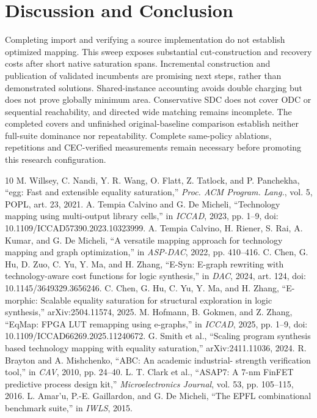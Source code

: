 \documentclass[conference]{IEEEtran}
\begin{document}
\section{Discussion and Conclusion}
Completing import and verifying a source implementation do not establish optimized mapping.
This sweep exposes substantial cut-construction and recovery costs after short native saturation spans.
Incremental construction and publication of validated incumbents are promising next steps, rather than demonstrated solutions.
Shared-instance accounting avoids double charging but does not prove globally minimum area.
Conservative SDC does not cover ODC or sequential reachability, and directed wide matching remains incomplete.
The completed covers and unfinished original-baseline comparison establish neither full-suite dominance nor repeatability.
Complete same-policy ablations, repetitions and CEC-verified measurements remain necessary before promoting this research configuration.

\clearpage
\twocolumn
\begin{thebibliography}{10}
 M. Willsey, C. Nandi, Y. R. Wang, O. Flatt, Z. Tatlock, and
P. Panchekha, ``egg: Fast and extensible equality saturation,''
\emph{Proc. ACM Program. Lang.}, vol. 5, POPL, art. 23, 2021.
 A. Tempia Calvino and G. De Micheli, ``Technology mapping
using multi-output library cells,'' in \emph{ICCAD}, 2023, pp. 1--9,
doi: 10.1109/ICCAD57390.2023.10323999.
 A. Tempia Calvino, H. Riener, S. Rai, A. Kumar, and
G. De Micheli, ``A versatile mapping approach for technology mapping and
graph optimization,'' in \emph{ASP-DAC}, 2022, pp. 410--416.
 C. Chen, G. Hu, D. Zuo, C. Yu, Y. Ma, and H. Zhang,
``E-Syn: E-graph rewriting with technology-aware cost functions for logic
synthesis,'' in \emph{DAC}, 2024, art. 124,
doi: 10.1145/3649329.3656246.
 C. Chen, G. Hu, C. Yu, Y. Ma, and H. Zhang,
``E-morphic: Scalable equality saturation for structural exploration in
logic synthesis,'' arXiv:2504.11574, 2025.
 M. Hofmann, B. Gokmen, and Z. Zhang,
``EqMap: FPGA LUT remapping using e-graphs,'' in \emph{ICCAD}, 2025,
pp. 1--9, doi: 10.1109/ICCAD66269.2025.11240672.
 G. Smith et al., ``Scaling program synthesis based
technology mapping with equality saturation,'' arXiv:2411.11036, 2024.
 R. Brayton and A. Mishchenko, ``ABC: An academic industrial-
strength verification tool,'' in \emph{CAV}, 2010, pp. 24--40.
 L. T. Clark et al., ``ASAP7: A 7-nm FinFET predictive
process design kit,'' \emph{Microelectronics Journal}, vol. 53,
pp. 105--115, 2016.
 L. Amar'u, P.-E. Gaillardon, and G. De Micheli, ``The EPFL combinational benchmark suite,'' in \emph{IWLS}, 2015.
\end{thebibliography}
\end{document}
